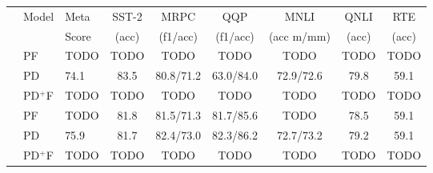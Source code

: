 \begin{table}[]
    \vspace{-10pt}
    \centering
    \begin{tabular}{l|l|g|c|c|c|c|c|c}
         \toprule
         & Model & Meta & SST-2 & MRPC & QQP & MNLI & QNLI & RTE \\
         & 
            & Score 
            & \footnotesize (acc)
            & \footnotesize (f1/acc)
            & \footnotesize (f1/acc)
            & \footnotesize (acc m/mm)
            & \footnotesize (acc)
            & \footnotesize (acc) \\
         \midrule
         \parbox[t]{3mm}{}
         & PF &
            TODO &      %
            TODO &      %
            TODO &      %
            TODO &      %
            TODO &      %
            TODO &      %
            TODO \\     %
         & PD &
            74.1 &              %
            83.5 &              %
            80.8/71.2 &         %
            63.0/84.0 &         %
            72.9/72.6 &         %
            79.8 &              %
            59.1 \\             %
         & PD$^+$F &
            TODO &      %
            TODO &      %
            TODO &      %
            TODO &      %
            TODO &      %
            TODO &      %
            TODO \\     %
         \midrule
         \parbox[t]{3mm}{}
         & PF &
            TODO &              %
            81.8 &              %
            81.5/71.3 &         %
            81.7/85.6 &         %
            TODO &      %
            78.5 &              %
            59.1 \\             %
         & PD &
            75.9 &              %
            81.7 &              %
            82.4/73.0 &         %
            82.3/86.2 &         %
            72.7/73.2 &         %
            79.2 &              %
            59.1 \\             %
         & PD$^+$F &
            TODO &      %
            TODO &      %
            TODO &      %
            TODO &      %
            TODO &      %
            TODO &      %
            TODO \\     %

\end{tabular}
\end{table}
